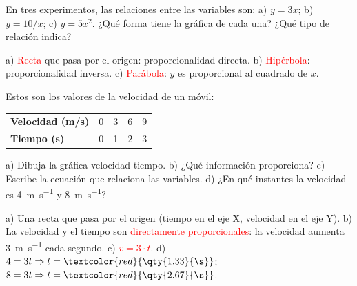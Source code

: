 \begin{exercise}
    En tres experimentos, las relaciones entre las variables son: a) \(y = 3x\); b) \(y = 10/x\); c) \(y = 5x^2\). ¿Qué forma tiene la gráfica de cada una? ¿Qué tipo de relación indica?
    \begin{solu}
        a) \textcolor{red}{Recta} que pasa por el origen: proporcionalidad directa.
        b) \textcolor{red}{Hipérbola}: proporcionalidad inversa.
        c) \textcolor{red}{Parábola}: \(y\) es proporcional al cuadrado de \(x\).
    \end{solu}
\end{exercise}

\begin{exercise}
    Estos son los valores de la velocidad de un móvil:
    \begin{center}
        \begin{tabular}{@{}lcccc@{}}
            \toprule
            \textbf{Velocidad (m/s)} & 0 & 3 & 6 & 9 \\[3pt]
            \textbf{Tiempo (s)} & 0 & 1 & 2 & 3 \\
            \bottomrule
        \end{tabular}
    \end{center}
    a) Dibuja la gráfica velocidad-tiempo. b) ¿Qué información proporciona? c) Escribe la ecuación que relaciona las variables. d) ¿En qué instantes la velocidad es \qty{4}{\m\per\s} y \qty{8}{\m\per\s}?
    \begin{solu}
        a) Una recta que pasa por el origen (tiempo en el eje X, velocidad en el eje Y).
        b) La velocidad y el tiempo son \textcolor{red}{directamente proporcionales}: la velocidad aumenta \qty{3}{\m\per\s} cada segundo.
        c) \textcolor{red}{\(v = 3 \cdot t\)}.
        d) \(4 = 3t \Rightarrow t = \textcolor{red}{\qty{1.33}{\s}}\); \(8 = 3t \Rightarrow t = \textcolor{red}{\qty{2.67}{\s}}\).
    \end{solu}
\end{exercise}

